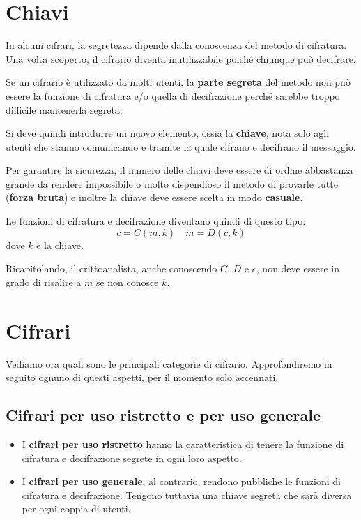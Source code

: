 \section{Chiavi}\label{chiavi}
In alcuni cifrari, la segretezza dipende dalla conoscenza del metodo di cifratura. Una volta scoperto, il cifrario
diventa inutilizzabile poich\'e chiunque pu\`o decifrare.

Se un cifrario \`e utilizzato da molti utenti, la \textbf{parte segreta} del metodo non pu\`o essere la funzione di
cifratura e/o quella di decifrazione perch\'e sarebbe troppo difficile mantenerla segreta.

Si deve quindi introdurre un nuovo elemento, ossia la \textbf{chiave}, nota solo agli utenti che stanno comunicando e
tramite la quale cifrano e decifrano il messaggio.

Per garantire la sicurezza, il numero delle chiavi deve essere di ordine abbastanza grande da rendere impossibile o
molto dispendioso il metodo di provarle tutte (\textbf{forza bruta}) e inoltre la chiave deve essere scelta in modo
\textbf{casuale}.

Le funzioni di cifratura e decifrazione diventano quindi di questo tipo:
\[ c = C(m, k) \quad m = D(c, k) \]
dove $k$ \`e la chiave.

Ricapitolando, il crittoanalista, anche conoscendo $C$, $D$ e $c$, non deve essere in grado di risalire a $m$ se non
conosce $k$.

\section{Cifrari}\label{cifrari}
Vediamo ora quali sono le principali categorie di cifrario. Approfondiremo in seguito ognuno di questi aspetti,
per il momento solo accennati.

\subsection{Cifrari per uso ristretto e per uso generale}
\begin{itemize}
	\item I \textbf{cifrari per uso ristretto} hanno la caratteristica di tenere la funzione di cifratura e
	      decifrazione segrete in ogni loro aspetto.
	\item I \textbf{cifrari per uso generale}, al contrario, rendono pubbliche le funzioni di cifratura e decifrazione.
	      Tengono tuttavia una chiave segreta che sar\`a diversa per ogni coppia di utenti.
\end{itemize}

